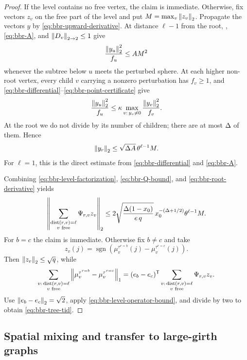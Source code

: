 \begin{proof}
If the level contains no free vertex, the claim is immediate.  Otherwise,
fix vectors \(z_v\) on the free part of the
level and put
\(M=\max_v\left\|z_v\right\|_2\).  Propagate the vectors \(y\) by
\eqref{eq:bbr-upward-derivative}.  At distance \(\ell-1\) from the root,
, \eqref{eq:bbr-A}, and
\(\left\|D_v\right\|_{2\to2}\le1\) give
\begin{equation}
 \frac{\left\|y_u\right\|_2^2}{f_u}\le AM^2
 \label{eq:bbr-first-level}
\end{equation}
whenever the subtree below \(u\) meets the perturbed sphere.  At each higher non-root vertex,
every child \(v\) carrying a nonzero perturbation has \(f_v\ge1\), and
\eqref{eq:bbr-differential}--\eqref{eq:bbr-point-certificate} give
\[
 \frac{\left\|y_u\right\|_2^2}{f_u}
 \le\kappa
 \max_{v:\,y_v\ne0}\frac{\left\|y_v\right\|_2^2}{f_v}.
\]
At the root we do not divide by its number of children; there are at most
\(\Delta\) of them.  Hence
\begin{equation}
 \left\|y_r\right\|_2\le\sqrt{\Delta A}\,\theta^{\ell-1}M.
 \label{eq:bbr-root-derivative}
\end{equation}
For \(\ell=1\), this is the direct estimate from
\eqref{eq:bbr-differential} and \eqref{eq:bbr-A}.

Combining \eqref{eq:bbr-level-factorization},
\eqref{eq:bbr-Q-bound}, and \eqref{eq:bbr-root-derivative} yields
\begin{equation}
 \left\|\sum_{\substack{\operatorname{dist}(r,v)=\ell\\v\text{ free}}}
   \Psi_{r,v}z_v\right\|_2
 \le2\sqrt{\frac{\Delta(1-x_0)}{e\,q}}\,
 x_0^{-(\Delta+1/2)}\theta^{\ell-1}M.
 \label{eq:bbr-level-operator-bound}
\end{equation}
For \(b=c\) the claim is immediate.  Otherwise fix \(b\ne c\) and take
\[
 z_v(j)=\operatorname{sgn}\!\left(
   \mu_v^{\tau^{r=b}}(j)-\mu_v^{\tau^{r=c}}(j)
 \right).
\]
Then \(\left\|z_v\right\|_2\le\sqrt q\), while
\[
 \sum_{\substack{v:\,\operatorname{dist}(r,v)=\ell\\v\text{ free}}}
   \left\|\mu_v^{\tau^{r=b}}-\mu_v^{\tau^{r=c}}\right\|_1
 =(e_b-e_c)^{\mathsf T}
   \sum_{\substack{v:\,\operatorname{dist}(r,v)=\ell\\v\text{ free}}}
     \Psi_{r,v}z_v.
\]
Use \(\left\|e_b-e_c\right\|_2=\sqrt2\), apply
\eqref{eq:bbr-level-operator-bound}, and divide by two to obtain
\eqref{eq:bbr-tree-tid}.
\end{proof}

\subsection{Spatial mixing and transfer to large-girth graphs}

